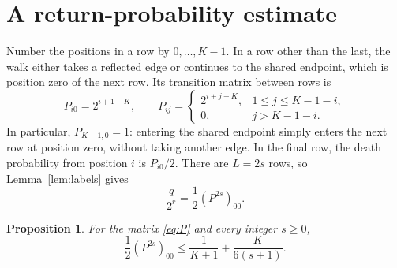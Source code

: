 \documentclass[reqno]{amsart}
\newtheorem{proposition}[theorem]{Proposition}
\theoremstyle{remark}
\numberwithin{equation}{section}
\begin{document}
\section{A return-probability estimate}

Number the positions in a row by $0,\ldots,K-1$. In a row other than the
last, the walk either takes a reflected edge or continues to the shared
endpoint, which is position zero of the next row. Its transition matrix
between rows is
\begin{equation}\label{eq:P}
 P_{i0}=2^{i+1-K},\qquad
 P_{ij}=\begin{cases}
 2^{i+j-K},&1\leq j\leq K-1-i,\\
 0,&j>K-1-i.
 \end{cases}
\end{equation}
In particular, $P_{K-1,0}=1$: entering the shared endpoint simply enters
the next row at position zero, without taking another edge.
In the final row, the death probability from position $i$ is $P_{i0}/2$.
There are $L=2s$ rows, so Lemma~\ref{lem:labels} gives
\begin{equation}\label{eq:detreturn}
 \frac{q}{2^r}=\frac12(P^{2s})_{00}.
\end{equation}

\begin{proposition}\label{prop:return}
For the matrix \eqref{eq:P} and every integer $s\geq0$,
\[
 \frac12(P^{2s})_{00}
 \leq\frac1{K+1}+\frac{K}{6(s+1)}.
\]
\end{proposition}
\end{document}
